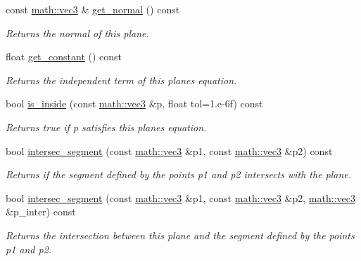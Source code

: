 \begin{DoxyCompactItemize}
\mbox{\label{classphysim_1_1geom_1_1plane_a06c074a0807102ee35dddf70db8e6e80}} 
const \hyperlink{structphysim_1_1math_1_1vec3}{math\+::vec3} \& \hyperlink{classphysim_1_1geom_1_1plane_a06c074a0807102ee35dddf70db8e6e80}{get\+\_\+normal} () const
\begin{DoxyCompactList}\small\item\em Returns the normal of this plane. \end{DoxyCompactList}\item 
\mbox{\label{classphysim_1_1geom_1_1plane_a30e146a6111a7924d199f7f6170b54d5}} 
float \hyperlink{classphysim_1_1geom_1_1plane_a30e146a6111a7924d199f7f6170b54d5}{get\+\_\+constant} () const
\begin{DoxyCompactList}\small\item\em Returns the independent term of this plane\textquotesingle{}s equation. \end{DoxyCompactList}\item 
bool \hyperlink{classphysim_1_1geom_1_1plane_a2a82c9b43f0883e0cfb7e49fe71b3434}{is\+\_\+inside} (const \hyperlink{structphysim_1_1math_1_1vec3}{math\+::vec3} \&p, float tol=1.e-\/6f) const
\begin{DoxyCompactList}\small\item\em Returns true if {\itshape p} satisfies this plane\textquotesingle{}s equation. \end{DoxyCompactList}\item 
bool \hyperlink{classphysim_1_1geom_1_1plane_aa424f3bd6b5d4dc9f69683bbcda8c876}{intersec\+\_\+segment} (const \hyperlink{structphysim_1_1math_1_1vec3}{math\+::vec3} \&p1, const \hyperlink{structphysim_1_1math_1_1vec3}{math\+::vec3} \&p2) const
\begin{DoxyCompactList}\small\item\em Returns if the segment defined by the points {\itshape p1} and {\itshape p2} intersects with the plane. \end{DoxyCompactList}\item 
bool \hyperlink{classphysim_1_1geom_1_1plane_a2ec8e396f3e61e6c262236f560abfff5}{intersec\+\_\+segment} (const \hyperlink{structphysim_1_1math_1_1vec3}{math\+::vec3} \&p1, const \hyperlink{structphysim_1_1math_1_1vec3}{math\+::vec3} \&p2, \hyperlink{structphysim_1_1math_1_1vec3}{math\+::vec3} \&p\+\_\+inter) const
\begin{DoxyCompactList}\small\item\em Returns the intersection between this plane and the segment defined by the points {\itshape p1} and {\itshape p2}. \end{DoxyCompactList}\item 

\end{DoxyCompactItemize}
